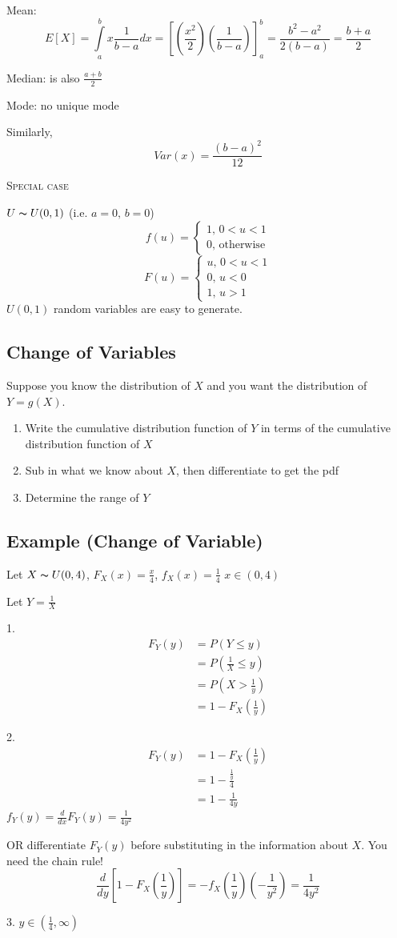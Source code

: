 Mean:
\[ E[X]=\int\limits_{a}^{b} x \frac{1}{b-a} d{x}
=\left[\left(\frac{x^2}{2}\right)\left(\frac{1}{b-a}\right)\right]_a^b
=\frac{b^2-a^2}{2(b-a)}=\frac{b+a}{2} \]

Median: is also $ \frac{a+b}{2} $

Mode: no unique mode

Similarly,
\[ Var(x)=\frac{(b-a)^2}{12} \]

\textsc{Special case}

$ U \thicksim U(0,1) $ (i.e. $ a=0,\,b=0 $)
\[ f(u)=
\begin{cases}
    1,\,0<u<1\\
    0,\,\text{otherwise}
\end{cases} \]
\[ F(u)=
\begin{cases}
    u,\,0<u<1\\
    0,\,u<0\\
    1,\,u>1
\end{cases} \]
$ U(0,1) $ random variables are easy to generate.

\subsection{Change of Variables}
Suppose you know the distribution of $ X $ and you want the distribution of
$ Y=g(X) $.
\begin{enumerate}[1.]
    \item Write the cumulative distribution function of $ Y $ in terms of the cumulative distribution function of $ X $
    \item Sub in what we know about $ X $, then differentiate to get the pdf
    \item Determine the range of $ Y $
\end{enumerate}
\subsection{Example (Change of Variable)}
Let $ X \thicksim U(0,4) $, $ F_X(x)=\frac{x}{4} $, $ f_X(x)=\frac{1}{4} $ 
$ x\in(0,4) $

Let $ Y=\frac{1}{X} $

1.
\begin{align*}
    F_Y(y)&=P\left(Y\le y\right)\\
    &=P\left(\frac{1}{X} \le y\right)\\
    &=P\left(X>\frac{1}{y}\right)\\
    &=1-F_X\left(\frac{1}{y}\right)
\end{align*}

2.
\begin{align*}
    F_Y(y)&=1-F_X\left(\frac{1}{y}\right)\\
    &=1-\frac{\frac{1}{y}}{4}\\
    &=1-\frac{1}{4y}
\end{align*}
$ f_Y(y)=\frac{d}{dx}F_Y(y)=\frac{1}{4y^2} $

OR differentiate $ F_Y(y) $ before
substituting in the information about $ X $. You need the chain rule!
\[ \frac{d}{dy}\left[1-F_X\left(\frac{1}{y}\right)\right]=
-f_X\left(\frac{1}{y}\right)\left(-\frac{1}{y^2}\right)=\frac{1}{4y^2} \]

3. $ y\in(\frac{1}{4},\infty) $
